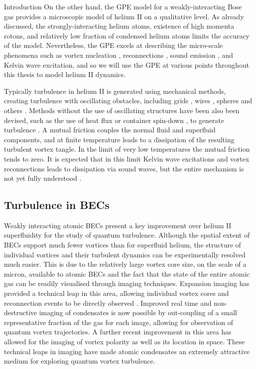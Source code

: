 \begin{chapter}{\label{cha:bose_gases}Introduction}
On the other hand, the GPE model for a weakly-interacting Bose gas provides a microscopic model of helium II on a qualitative level. As already discussed, the strongly-interacting helium atoms, existence of high momenta rotons, and relatively low fraction of condensed helium atoms limits the accuracy of the model. Nevertheless, the GPE excels at describing the micro-scale phenomena such as vortex nucleation \cite{frisch92}, reconnections \cite{PhysRevLett.71.1375, PhysRevLett.76.4745}, sound emission \cite{leadbeater,PhysRevA.69.053601}, and Kelvin wave excitation, and so we will use the GPE at various points throughout this thesis to model helium II dynamics.

Typically turbulence in helium II is generated using mechanical methods, creating turbulence with oscillating obstacles, including grids \cite{Davis2000}, wires \cite{Guenault1986,Bradley2011,Fisher2001}, spheres \cite{Schoepe1995} and others \cite{Blaauwgeers2007,Bradley2012,Tabeling1998,Salort,VinenSkrbek2008}. Methods without the use of oscillating structures have been also been devised, such as the use of heat flux \cite{Vinen114} or container spin-down \cite{PhysRevLett.99.265302}, to generate turbulence . A mutual friction \cite{Donnelly} couples the normal fluid and superfluid components, and at finite temperature leads to a dissipation of the resulting turbulent vortex tangle. In the limit of very low temperatures the mutual friction tends to zero. It is expected that in this limit Kelvin wave excitations \cite{leadbeater,PhysRevA.69.053601} and vortex reconnections leads to dissipation via sound waves, but the entire mechanism is not yet fully understood \cite{PhysRevB.61.1410}.

\subsection{Turbulence in BECs}

Weakly interacting atomic BECs present a key improvement over helium II superfluidity for the study of quantum turbulence. Although the spatial extent of BECs support much fewer vortices than for superfluid helium, the structure of individual vortices and their turbulent dynamics can be experimentally resolved much easier. This is due to the relatively large vortex core size, on the scale of a micron, available to atomic BECs and the fact that the state of the entire atomic gas can be readily visualised through imaging techniques. Expansion imaging has provided a technical leap in this area, allowing individual vortex cores and reconnection events to be directly observed \cite{PhysRevLett.84.806,Raman01,kwon_moon_14}. Improved real time and non-destructive imaging of condensates is now possible \cite{Freilich2010} by out-coupling of a small representative fraction of the gas for each image, allowing for observation of quantum vortex trajectories. A further recent improvement in this area \cite{powis} has allowed for the imaging of vortex polarity as well as its location in space. These technical leaps in imaging have made atomic condensates an extremely attractive medium for exploring quantum vortex turbulence. 


\end{chapter}
